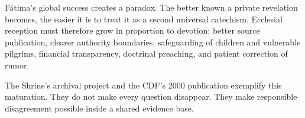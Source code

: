 Fátima's global success creates a paradox. The better known a private revelation becomes, the easier it is to treat it as a second universal catechism. Ecclesial reception must therefore grow in proportion to devotion: better source publication, clearer authority boundaries, safeguarding of children and vulnerable pilgrims, financial transparency, doctrinal preaching, and patient correction of rumor.

The Shrine's archival project and the CDF's 2000 publication exemplify this maturation. They do not make every question disappear. They make responsible disagreement possible inside a shared evidence base.
